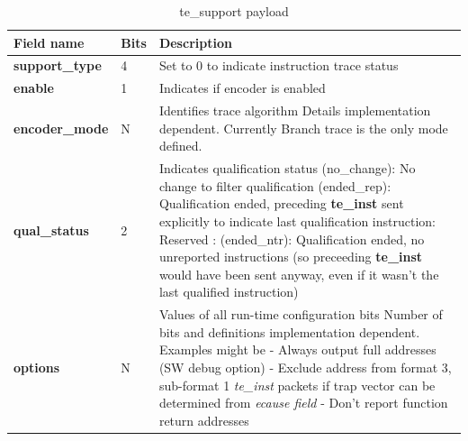 \begin{table}[!h]
    \centering
    \caption{te\_support payload}
    \label{tab:te_support}
    \begin{tabulary}{\textwidth}{|l|p{8mm}|p{80mm}|}
        \hline
        \textbf {Field name} & \textbf {Bits} & \textbf {Description} \\
        \hline
        \textbf{support\_type} & 4 & Set to 0 to indicate instruction trace status \\
        \hline
        \textbf{enable} & 1 & Indicates if encoder is enabled\\
        \hline
        \textbf{encoder\_mode} & N & Identifies trace algorithm\newline
          Details implementation dependent.  Currently Branch trace is the only mode defined.\\
        \hline
        \textbf{qual\_status} & 2 & Indicates qualification status (no\_change): No change to filter qualification  (ended\_rep): Qualification ended, preceding \textbf{te\_inst} sent explicitly to indicate last qualification instruction: Reserved : (ended\_ntr): Qualification ended, no unreported instructions (so preceeding \textbf{te\_inst} would have been sent anyway, even if it wasn't the last qualified instruction)\\
        \hline
        \textbf{options} & N & Values of all run-time configuration bits\newline
          Number of bits and definitions implementation dependent.  Examples might be\newline
          - Always output full addresses (SW debug option)\newline
          - Exclude address from format 3, sub-format 1 \textit{te\_inst} packets if trap vector can be determined from \textit{ecause field}\newline
          - Don't report function return addresses\\
          \hline
    \end{tabulary}
\end{table}

